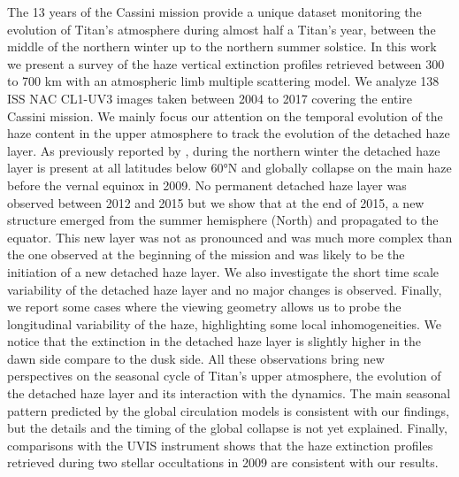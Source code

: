The 13 years of the Cassini mission provide a unique dataset monitoring
the evolution of Titan’s atmosphere during almost half a Titan's year,
between the middle of the northern winter up to the northern summer solstice.
In this work we present a survey of the haze vertical extinction profiles retrieved
between 300 to 700 km with an atmospheric limb multiple scattering model.
We analyze 138 ISS NAC CL1-UV3 images taken between 2004 to 2017 covering the
entire Cassini mission.
We mainly focus our attention on the temporal evolution of the haze content
in the upper atmosphere to track the evolution of the detached haze layer.
As previously reported by \cite{West2011}, during the northern winter the detached haze layer is present
at all latitudes below \ang{60}N and globally collapse on the main haze
before the vernal equinox in 2009.
No permanent detached haze layer was observed between 2012 and 2015 but
we show that at the end of 2015, a new structure emerged from
the summer hemisphere (North) and propagated to the equator. This new layer
was not as pronounced and was much more complex than the one observed at the
beginning of the mission and was likely to be the initiation of a new detached haze layer.
We also investigate the short time scale variability of the detached haze
layer and no major changes is observed. Finally, we report some cases
where the viewing geometry allows us to probe the longitudinal variability
of the haze, highlighting some local inhomogeneities.
We notice that the extinction in the detached haze layer is slightly higher in the dawn
side compare to the dusk side.
All these observations bring new perspectives
on the seasonal cycle of Titan's upper atmosphere, the evolution of the detached
haze layer and its interaction with the dynamics.
The main seasonal pattern predicted by the global circulation models is consistent
with our findings, but the details and the timing of the global collapse
is not yet explained. Finally, comparisons with the UVIS instrument shows
that the haze extinction profiles retrieved during two stellar occultations
in 2009 are consistent with our results.